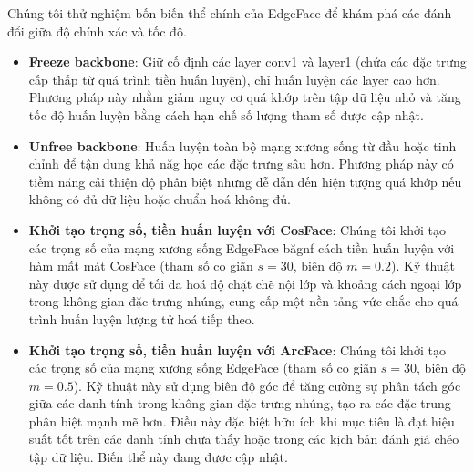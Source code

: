 Chúng tôi thử nghiệm bốn biến thể chính của EdgeFace để khám phá các đánh đổi giữa độ chính xác và tốc độ.

\begin{itemize}
    \item \textbf{Freeze backbone}: Giữ cố định các layer conv1 và layer1 (chứa các đặc trưng cấp thấp từ quá trình tiền huấn luyện), chỉ huấn luyện các layer cao hơn. Phương pháp này nhằm giảm nguy cơ quá khớp trên tập dữ liệu nhỏ và tăng tốc độ huấn luyện bằng cách hạn chế số lượng tham số được cập nhật.
    \item \textbf{Unfree backbone}: Huấn luyện toàn bộ mạng xương sống từ đầu hoặc tinh chỉnh để tận dung khả năg học các đặc trưng sâu hơn. Phương pháp này có tiềm năng cải thiện độ phân biệt nhưng đễ dẫn đến hiện tượng quá khớp nếu không có đủ dữ liệu hoặc chuẩn hoá không đủ.
    \item \textbf{Khởi tạo trọng số, tiền huấn luyện với CosFace}: Chúng tôi khởi tạo các trọng số của mạng xương sống EdgeFace băgnf cách tiền huấn luyện với hàm mất mát CosFace (tham số co giãn $s = 30$, biên độ $m = 0.2$). Kỹ thuật này được sử dụng để tối đa hoá độ chặt chẽ nội lớp và khoảng cách ngoại lớp trong không gian đặc trưng nhúng, cung cấp một nền tảng vức chắc cho quá trình huấn luyện lượng tử hoá tiếp theo.
    \item \textbf{Khởi tạo trọng số, tiền huấn luyện với ArcFace}: Chúng tôi khởi tạo các trọng số của mạng xương sống EdgeFace (tham số co giãn $s = 30$, biên độ $m = 0.5$). Kỹ thuật này sử dụng biên độ góc để tăng cường sự phân tách góc giữa các danh tính trong không gian đặc trưng nhúng, tạo ra các đặc trung phân biệt mạnh mẽ hơn. Điều này đặc biệt hữu ích khi mục tiêu là đạt hiệu suất tốt trên các danh tính chưa thấy hoặc trong các kịch bản đánh giá chéo tập dữ liệu. Biến thể này đang được cập nhật.
\end{itemize}

